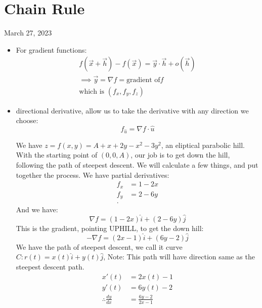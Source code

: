 \newpage
\section{Chain Rule}
March 27, 2023
\begin{itemize}
	\item For gradient functions:
		\begin{align*}
		f\left( \vec{x}+\vec{h}  \right) - f\left( \vec{x}\right) = \vec{y} \cdot  \vec{h} + o\left( \vec{h} \right) \\
		\implies \vec{y} = \nabla f = \text{gradient of} f\\
		\text{which is } \left( f_x, f_y, f_z \right) 
	\end{align*}
\item directional derivative, allow us to take the derivative with any direction we choose:
	\begin{equation}
		f_{\hat{u}} = \nabla f \cdot  \hat{u}
	\end{equation}
	\begin{example}
		We have $z = f\left( x,y \right) = A + x + 2y - x^2 - 3y^2$, an eliptical parabolic hill. With the starting point of $\left( 0,0,A \right) $, our job is to get down the hill, following the path of steepest descent. We will calculate a few things, and put together the process. We have partial derivatives:
		\begin{align*}
			f_x &= 1-2x \\
			f_y &= 2-6y \\
		.\end{align*}
		And we have:
		\begin{equation}
			\nabla f = \left( 1-2x \right) \hat{i} + \left( 2-6y \right) \hat{j}
		\end{equation}
		This is the gradient, pointing UPHILL, to get the down hill:
		\begin{equation}
			-\nabla f = \left( 2x-1 \right) \hat{i} + \left( 6y-2 \right) \hat{j}
		\end{equation}
		We have the path of steepest descent, we call it curve $C: r\left( t \right)  = x\left( t \right) \hat{i} + y\left( t \right) \hat{j}$, Note: This path will have direction same as the steepest descent path.
		\begin{align*}
			x'\left( t \right)  &= 2x\left( t \right) -1\\
			y'\left( t \right)  &= 6y\left( t \right)  - 2\\
			\therefore \frac{dy}{dx} &=  \frac{6y-2}{2x-1} \\

\end{align*}
\end{example}
\end{itemize}
